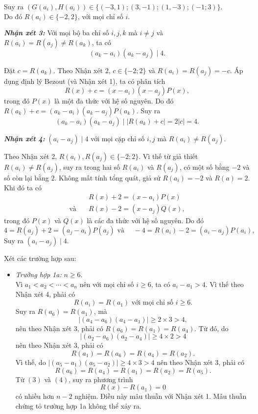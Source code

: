 \begin{bt}
{\begin{enumerate}
\begin{cm}
				Suy ra $(G(a_i), H(a_i))\in \{(-3,1); (3,-1); (1,-3); (-1;3)\}$.\\
				Do đó $R(a_i)\in \{-2, 2\}$, với mọi chỉ số $i$.
			\end{cm}
			\textit{\bf Nhận xét 3:} Với mọi bộ ba chỉ số $i, j, k$ mà $i\ne j$ và $R(a_i)=R(a_j)\ne R(a_k)$, ta có
			$$ (a_k-a_i)(a_k-a_j) \mid 4. $$
			\begin{cm}
				Đặt $c= R(a_k)$. Theo Nhận xét 2, $c\in\{-2; 2\}$  và $R(a_i)=R(a_j)=-c$. Áp dụng định lý Bezout (và Nhận xét 1), ta có phân tích
				$$ R(x)+c= (x-a_i)(x-a_j)P(x), $$
				trong đó $P(x)$ là một đa thức với hệ số nguyên. Do đó $R(a_k)+c= (a_k-a_i)(a_k-a_j)P(a_k)$. Suy ra
				$$ (a_k-a_i)(a_k-a_j) \mid |R(a_k)+c|=2|c|=4. $$
			\end{cm}
			\textit{\bf Nhận xét 4:} $(a_i-a_j) \mid 4$ với mọi cặp chỉ số $i, j$ mà $R(a_i)\ne R(a_j)$.
			\begin{cm}
				Theo Nhận xét 2, $R(a_i), R(a_j)\in \{-2; 2\}$. Vì thế từ giả thiết $R(a_i)\ne R(a_j)$, suy ra trong hai số $R(a_i)$ và $ R(a_j)$, có một số bằng $-2$ và số còn lại bằng $2$. Không mất tính tổng quát, giả sử $R(a_i)=-2$ và $R(a)=2$. Khi đó ta có
				\begin{align*}
				&R(x)+2=(x-a_i)P(x)\\ 
				\mbox{và}\quad &R(x)-2=(x-a_j)Q(x),
				\end{align*}
				trong đó $P(x)$ và $Q(x)$ là các đa thức với hệ số nguyên. Do đó 
				$$ 4= R(a_j)+2=(a_j-a_i)P(a_j) \mbox{ và }\quad -4= R(a_i)-2=(a_i-a_j)P(a_i),$$
				Suy ra $(a_i- a_j) \mid 4$.
			\end{cm}
			Xét các trường hợp sau:
			\begin{itemize}
				\item \textit{Trường hợp 1a:} $n\geq 6$.\\
				Vì $a_1<a_2<\cdots <a_n$ nên với mọi chỉ số $i\geq 6$, ta có $a_i-a_1>4$. Vì thế theo Nhận xét 4, phải có
				\[ R(a_i)=R(a_1) \mbox{ với mọi chỉ số } i\geq 6. \tag{3} \]
				Suy ra $R(a_6)=R(a_1)$, mà 
				$$ |(a_4-a_6)(a_4-a_1)|\geq 2\times 3>4, $$
				nên theo Nhận xét 3, phải có $ R(a_6)=R(a_1)=R(a_4)$.
				Từ đó, do 
				$$|(a_2-a_6)(a_2-a_4)|\geq 4\times 2>4$$
				nên theo Nhận xét 3, phải có
				$$ R(a_1)=R(a_6)=R(a_4)=R(a_2). $$
				Vì thế, do $|(a_5-a_1)(a_5-a_2)|\geq 4\times 3>4$ nên theo Nhận xét 3, phải có
				\[ R(a_6)=R(a_4)=R(a_1)=R(a_2)=R(a_5).\tag{4} \]
				Từ $(3)$ và $(4)$, suy ra phương trình
				$$ R(x)-R(a_1)=0 $$
				có nhiều hơn $n-2$ nghiệm. Điều này mâu thuẫn với Nhận xét 1.
				Mâu thuẫn chứng tỏ trường hợp 1a không thể xảy ra.

\end{itemize}
\end{enumerate}}
\end{bt}
